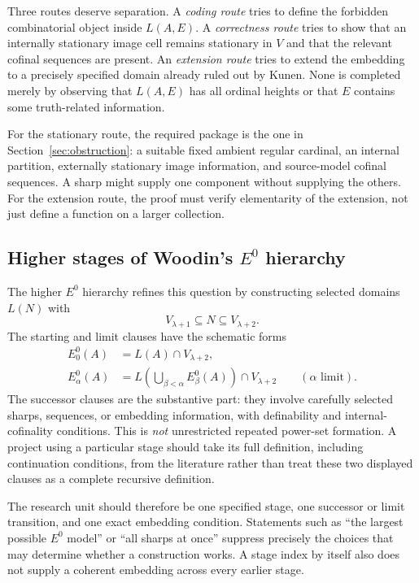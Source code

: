 \documentclass[11pt,letterpaper]{article}
\theoremstyle{definition}
\begin{document}
Three routes deserve separation. A \emph{coding route} tries to define the forbidden combinatorial object inside $L(A,E)$. A \emph{correctness route} tries to show that an internally stationary image cell remains stationary in $V$ and that the relevant cofinal sequences are present. An \emph{extension route} tries to extend the embedding to a precisely specified domain already ruled out by Kunen. None is completed merely by observing that $L(A,E)$ has all ordinal heights or that $E$ contains some truth-related information.

For the stationary route, the required package is the one in Section~\ref{sec:obstruction}: a suitable fixed ambient regular cardinal, an internal partition, externally stationary image information, and source-model cofinal sequences. A sharp might supply one component without supplying the others. For the extension route, the proof must verify elementarity of the extension, not just define a function on a larger collection.

\subsection{Higher stages of Woodin's $E^0$ hierarchy}

The higher $E^0$ hierarchy refines this question by constructing selected domains $L(N)$ with
\[
 V_{\lambda+1}\subseteq N\subseteq V_{\lambda+2}.
\]
The starting and limit clauses have the schematic forms
\begin{align*}
 E^0_0(A)&=L(A)\cap V_{\lambda+2},\\
 E^0_\alpha(A)&=L\!\left(\bigcup_{\beta<\alpha}E^0_\beta(A)\right)
                       \cap V_{\lambda+2}\qquad(\alpha\text{ limit}).
\end{align*}
The successor clauses are the substantive part: they involve carefully selected sharps, sequences, or embedding information, with definability and internal-cofinality conditions. This is \emph{not} unrestricted repeated power-set formation. A project using a particular stage should take its full definition, including continuation conditions, from the literature rather than treat these two displayed clauses as a complete recursive definition. \cite[Definition~2.6]{ld}

The research unit should therefore be one specified stage, one successor or limit transition, and one exact embedding condition. Statements such as ``the largest possible $E^0$ model'' or ``all sharps at once'' suppress precisely the choices that may determine whether a construction works. A stage index by itself also does not supply a coherent embedding across every earlier stage.
\end{document}
